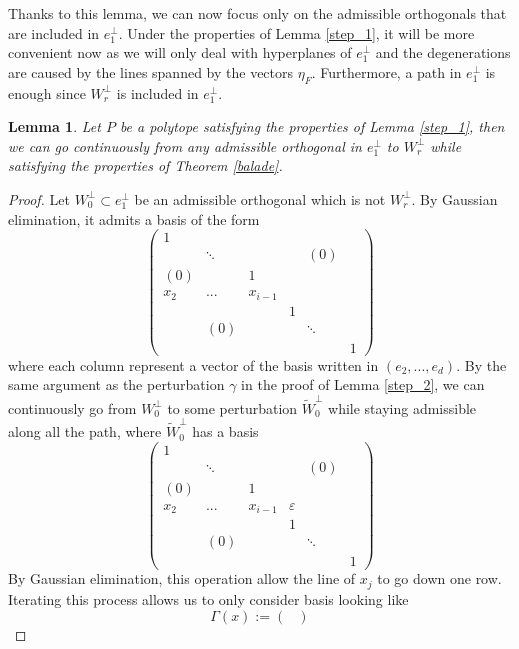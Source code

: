 \documentclass[12pt, notitlepage]{article}
\theoremstyle{plain}
\theoremstyle{definition}
\theoremstyle{plain}
\newtheorem{lemma}[thm]{Lemma}
\theoremstyle{remark}
\theoremstyle{plain}
\theoremstyle{plain}
\begin{document}
Thanks to this lemma, we can now focus only on the admissible orthogonals that are included in $e_1^\perp$. Under the properties of Lemma \ref{step_1}, it will be more convenient now as we will only deal with hyperplanes of $e_1^\perp$ and the degenerations are caused by the lines spanned by the vectors $\eta_F$. Furthermore, a path in $e_1^\perp$ is enough since $W_r^\perp$ is included in $e_1^\perp$.

\begin{lemma}
\label{step_3}
    Let $P$ be a polytope satisfying the properties of Lemma \ref{step_1}, then we can go continuously from any admissible orthogonal in $e_1^\perp$ to $W_r^\perp$ while satisfying the properties of Theorem \ref{balade}.
\end{lemma}

\begin{proof}
    Let $W_0^\perp\subset e_1^\perp$ be an admissible orthogonal which is not $W_r^\perp$. By Gaussian elimination, it admits a basis of the form \[ \begin{pmatrix}
        1& & & & & \\
         &\ddots& & &(0)& \\
        (0)& &1& & & \\
        x_2&...&x_{i-1}& & & \\
         & & &1& & \\
         &(0)& & &\ddots& \\
         & & & & &1
    \end{pmatrix} \] where each column represent a vector of the basis written in $(e_2,...,e_d)$. By the same argument as the perturbation $\gamma$ in the proof of Lemma \ref{step_2}, we can continuously go from $W_0^\perp$ to some perturbation $\tilde W_0^\perp$ while staying admissible along all the path, where $\tilde W_0^\perp$ has a basis \[ \begin{pmatrix}
        1& & & & & \\
         &\ddots& & &(0)& \\
        (0)& &1& & & \\
        x_2&...&x_{i-1}&\varepsilon& & \\
         & & &1& & \\
         &(0)& & &\ddots& \\
         & & & & &1
    \end{pmatrix} \] By Gaussian elimination, this operation allow the line of $x_j$ to go down one row. Iterating this process allows us to only consider basis looking like \[ \Gamma(x) := \begin{pmatrix}

\end{pmatrix}\]
\end{proof}
\end{document}
